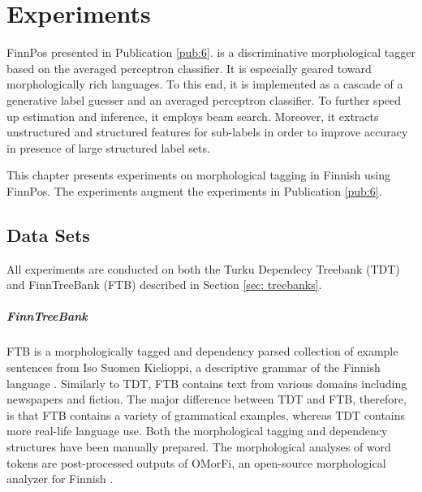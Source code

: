 \chapter{Experiments}
\label{chapter:finnpos}

FinnPos presented in Publication \ref{pub:6}.  is a discriminative
morphological tagger based on the averaged perceptron classifier. It
is especially geared toward morphologically rich languages. To this
end, it is implemented as a cascade of a generative label guesser and
an averaged perceptron classifier. To further speed up estimation and
inference, it employs beam search. Moreover, it extracts unstructured
and structured features for sub-labels in order to improve accuracy in
presence of large structured label sets.

This chapter presents experiments on morphological tagging in Finnish
using FinnPos. The experiments augment the experiments in Publication
\ref{pub:6}.

\section{Data Sets}
All experiments are conducted on both the Turku Dependecy Treebank
\citep{haverinen2009,haverinen2014} (TDT) and FinnTreeBank
\citep{Voutilainen2011} (FTB) described in Section \ref{sec: treebanks}.

\paragraph{FinnTreeBank}
FTB \citep{Voutilainen2011} is a morphologically tagged and dependency parsed collection of example sentences from Iso Suomen Kielioppi, a descriptive grammar of the Finnish language \citep{Hakulinen2004}. Similarly to TDT, FTB contains text from various domains including newspapers and fiction. The major difference between TDT and FTB, therefore, is that FTB contains a variety of grammatical examples, whereas TDT contains more real-life language use.
Both the morphological tagging and dependency structures have been manually prepared.
The morphological analyses of word tokens are post-processed outputs of OMorFi, an open-source morphological analyzer for Finnish \citep{Pirinen2011}. %

